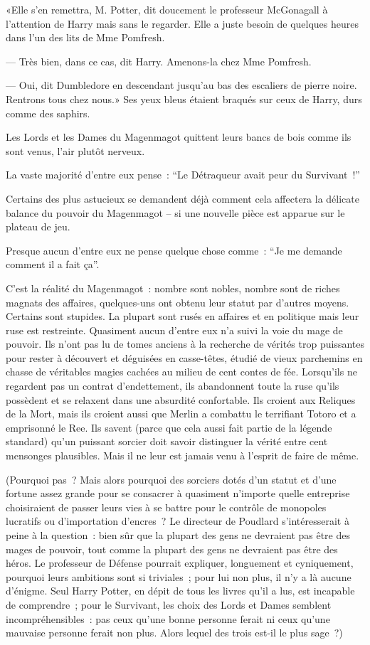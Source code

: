 «Elle s'en remettra, M. Potter, dit doucement le professeur McGonagall à l'attention de Harry mais sans le regarder. Elle a juste besoin de quelques heures dans l'un des lits de Mme Pomfresh.

--- Très bien, dans ce cas, dit Harry. Amenons-la chez Mme Pomfresh.

--- Oui, dit Dumbledore en descendant jusqu'au bas des escaliers de pierre noire. Rentrons tous chez nous.» Ses yeux bleus étaient braqués sur ceux de Harry, durs comme des saphirs.

\later

Les Lords et les Dames du Magenmagot quittent leurs bancs de bois comme ils sont venus, l'air plutôt nerveux.

La vaste majorité d'entre eux pense~: “Le Détraqueur avait peur du Survivant~!”

Certains des plus astucieux se demandent déjà comment cela affectera la délicate balance du pouvoir du Magenmagot -- si une nouvelle pièce est apparue sur le plateau de jeu.

Presque aucun d'entre eux ne pense quelque chose comme~: “Je me demande comment il a fait ça”.

C'est la réalité du Magenmagot~: nombre sont nobles, nombre sont de riches magnats des affaires, quelques-uns ont obtenu leur statut par d'autres moyens. Certains sont stupides. La plupart sont rusés en affaires et en politique mais leur ruse est restreinte. Quasiment aucun d'entre eux n'a suivi la voie du mage de pouvoir. Ils n'ont pas lu de tomes anciens à la recherche de vérités trop puissantes pour rester à découvert et déguisées en casse-têtes, étudié de vieux parchemins en chasse de véritables magies cachées au milieu de cent contes de fée. Lorsqu'ils ne regardent pas un contrat d'endettement, ils abandonnent toute la ruse qu'ils possèdent et se relaxent dans une absurdité confortable. Ils croient aux Reliques de la Mort, mais ils croient aussi que Merlin a combattu le terrifiant Totoro et a emprisonné le Ree. Ils savent (parce que cela aussi fait partie de la légende standard) qu'un puissant sorcier doit savoir distinguer la vérité entre cent mensonges plausibles. Mais il ne leur est jamais venu à l'esprit de faire de même.

(Pourquoi pas~? Mais alors pourquoi des sorciers dotés d'un statut et d'une fortune assez grande pour se consacrer à quasiment n'importe quelle entreprise choisiraient de passer leurs vies à se battre pour le contrôle de monopoles lucratifs ou d'importation d'encres~? Le directeur de Poudlard s'intéresserait à peine à la question~: bien sûr que la plupart des gens ne devraient pas être des mages de pouvoir, tout comme la plupart des gens ne devraient pas être des héros. Le professeur de Défense pourrait expliquer, longuement et cyniquement, pourquoi leurs ambitions sont si triviales~; pour lui non plus, il n'y a là aucune d'énigme. Seul Harry Potter, en dépit de tous les livres qu'il a lus, est incapable de comprendre~; pour le Survivant, les choix des Lords et Dames semblent incompréhensibles~: pas ceux qu'une bonne personne ferait ni ceux qu'une mauvaise personne ferait non plus. Alors lequel des trois est-il le plus sage~?)

